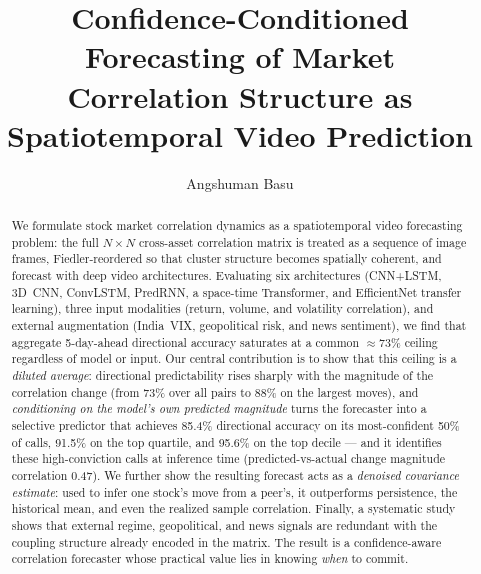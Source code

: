 \documentclass[runningheads]{llncs}
\begin{document}
\title{Confidence-Conditioned Forecasting of Market\\
Correlation Structure as Spatiotemporal Video Prediction}


\author{Angshuman Basu}



\maketitle

\begin{abstract}
We formulate stock market correlation dynamics as a spatiotemporal video
forecasting problem: the full $N \times N$ cross-asset correlation matrix
is treated as a sequence of image frames, Fiedler-reordered so that cluster
structure becomes spatially coherent, and forecast with deep video
architectures. Evaluating six architectures (CNN+LSTM, 3D~CNN, ConvLSTM,
PredRNN, a space-time Transformer, and EfficientNet transfer learning),
three input modalities (return, volume, and volatility correlation), and
external augmentation (India~VIX, geopolitical risk, and news sentiment),
we find that aggregate 5-day-ahead directional accuracy saturates at a
common $\approx$73\% ceiling regardless of model or input. Our central
contribution is to show that this ceiling is a \emph{diluted average}:
directional predictability rises sharply with the magnitude of the
correlation change (from 73\% over all pairs to 88\% on the largest
moves), and \emph{conditioning on the model's own predicted magnitude}
turns the forecaster into a selective predictor that achieves 85.4\%
directional accuracy on its most-confident 50\% of calls, 91.5\% on the
top quartile, and 95.6\% on the top decile --- and it identifies these
high-conviction calls at inference time (predicted-vs-actual change
magnitude correlation 0.47). We further show the resulting forecast acts
as a \emph{denoised covariance estimate}: used to infer one stock's move
from a peer's, it outperforms persistence, the historical mean, and even
the realized sample correlation. Finally, a systematic study shows that
external regime, geopolitical, and news signals are redundant with the
coupling structure already encoded in the matrix. The result is a
confidence-aware correlation forecaster whose practical value lies in
knowing \emph{when} to commit.

\end{abstract}
\end{document}
